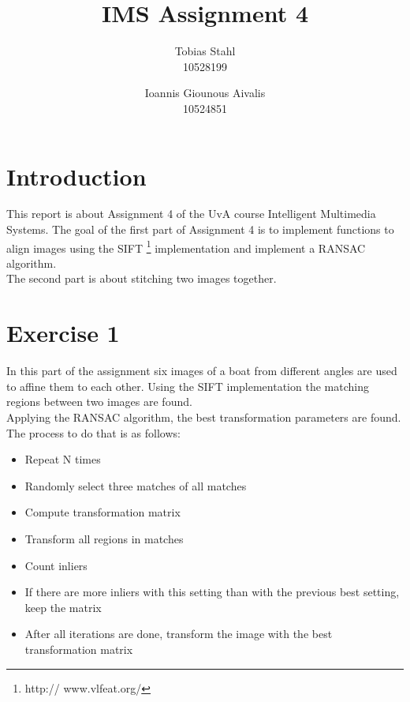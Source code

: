 \documentclass[11pt]{article}
\title{
	\textbf{IMS Assignment 4}
}
\author{Tobias Stahl \\ 10528199 \and Ioannis Giounous Aivalis \\ 10524851 }
\begin{document}
\maketitle

\section{Introduction}
This report is about Assignment 4 of the UvA course Intelligent Multimedia Systems. The goal of the first part of Assignment 4 is to implement functions to align images using the SIFT \footnote{http://
www.vlfeat.org/} implementation and implement a RANSAC algorithm.\\
The second part is about stitching two images together.

\section{Exercise 1}
In this part of the assignment six images of a boat from different angles are used to affine them to each other. Using the SIFT implementation the matching regions between two images are found.\\
Applying the RANSAC algorithm, the best transformation parameters are found. The process to do that is as follows:

\begin{itemize}
	\item 	Repeat N times
	\item	Randomly select three matches of all matches
	\item	Compute transformation matrix
	\item	Transform all regions in matches
	\item	Count inliers
	\item	If there are more inliers with this setting than with the previous best setting, keep the 			matrix
	\item	After all iterations are done, transform the image with the best transformation matrix
\end{itemize}
\end{document}

